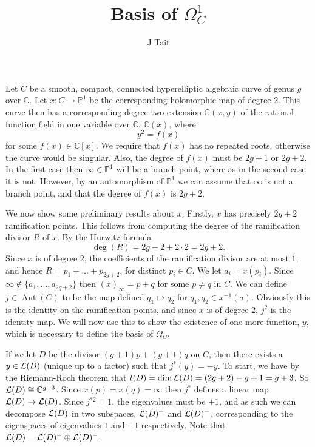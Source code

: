 \documentclass[11pt]{article} %
\title{Basis of $\Omega_C^1$}
\author{J Tait}
\theoremstyle{remark}
\newcommand{\cL}{{\cal L}}
\DeclareMathOperator{\aut}{Aut}
\begin{document}
\maketitle

Let $C$ be a smooth, compact, connected hyperelliptic algebraic curve of genus $g$ over $\mathbb{C}$.
Let $x:C\rightarrow \mathbb{P}^1$ be the corresponding holomorphic map of degree $2$.
This curve then has a corresponding degree two extension $\mathbb C(x,y)$ of the rational function field in one variable over $\mathbb C$, $\mathbb C(x)$, where
\[
 y^2 = f(x)
\]
for some $f(x)\in \mathbb C[x]$.
We require that $f(x)$ has no repeated roots, otherwise the curve would be singular.
Also, the degree of $f(x)$ must be $2g+1$ or $2g+2$.
In the first case then $\infty \in \mathbb P^1$ will be a branch point, where as in the second case it is not.
However, by an automorphism of $\mathbb P^1$ we can assume that $\infty$ is not a branch point, and that the degree of $f(x)$ is $2g+2$.

We now show some preliminary results about $x$. 
Firstly, $x$ has precisely $2g + 2$ ramification points.
This follows from computing the degree of the ramification divisor $R$ of $x$.
By the Hurwitz formula 
\[ 
\deg(R) = 2g -2 +2\cdot 2 = 2g + 2.
\]
Since $x$ is of degree $2$, the coefficients of the ramification divisor are at most $1$, and hence $R = p_1 + \ldots + p_{2g+2}$, for distinct $p_i\in C$.
We let $a_i = x(p_i)$.
Since $\infty \notin \{a_1,\ldots ,a_{2g+2}\}$ then $(x)_{\infty} = p + q$ for some $p \neq q $ in $C$.
We can define $j\in \aut(C)$ to be the map defined $q_1 \mapsto q_2$ for $q_1, q_2 \in x^{-1}(a)$. 
Obviously this is the identity on the ramification points, and since $x$ is of degree $2$, $j^2$ is the identity map.
We will now use this to show the existence of one more function, $y$, which is necessary to define the basis of $\Omega_C$.

If we let $D$ be the divisor $(g+1)p + (g+1)q$ on $C$, then there exists a $y \in \cL(D)$ (unique up to a factor) such that $j^* (y) = -y$.
To start, we have by the Riemann-Roch theorem that $l(D) = \dim\cL(D) = (2g+2)-g+1 = g+3$.
So $\cL(D) \cong \mathbb{C}^{g+3}$.
Since $x(p) = x(q) = \infty$ then $j^*$ defines a linear map $\cL(D) \rightarrow \cL(D)$.
Since $j^{*2} = 1$, the eigenvalues must be $\pm 1$, and as such we can decompose $\cL(D)$ in two subspaces, $\cL(D)^+$ and $\cL(D)^-$, corresponding to the eigenspaces of eigenvalues $1$ and $-1$ respectively.
Note that $\cL(D) = \cL(D)^+ \oplus \cL(D)^-$.
\end{document}
